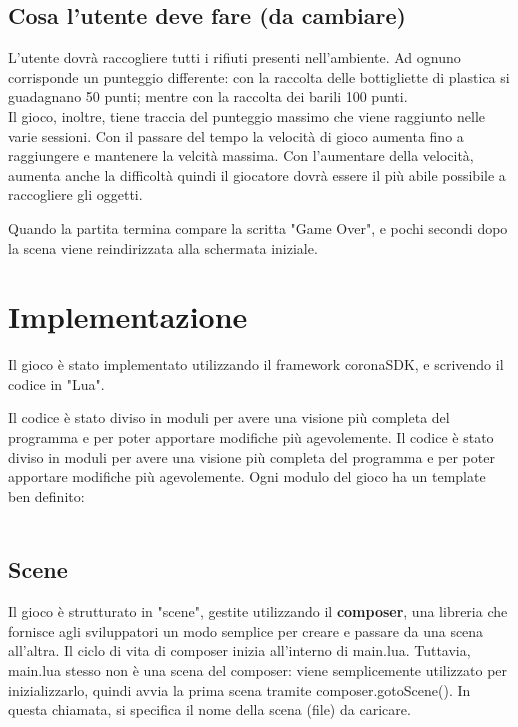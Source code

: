 \documentclass[12pt]{article}
\begin{document}
\subsection{Cosa l'utente deve fare (da cambiare)}
 
L'utente dovrà raccogliere tutti i rifiuti presenti nell'ambiente. Ad ognuno corrisponde un punteggio differente: con la raccolta delle bottigliette di plastica si guadagnano 50 punti; mentre con la raccolta dei barili 100 punti. 
\\Il gioco, inoltre, tiene traccia del punteggio massimo che viene raggiunto nelle varie sessioni.
Con il passare del tempo la velocità di gioco aumenta fino a raggiungere e mantenere la velcità massima. Con l'aumentare della velocità, aumenta anche la difficoltà quindi il giocatore dovrà essere il più abile possibile a raccogliere gli oggetti. 


Quando la partita termina compare la scritta "Game Over", e pochi secondi dopo la scena viene reindirizzata alla schermata iniziale. 

\section{Implementazione}
Il gioco è stato implementato utilizzando il framework coronaSDK, e scrivendo il codice in "Lua". 


Il codice è stato diviso in moduli per avere una visione più completa del programma e per poter apportare modifiche più agevolemente. 
Il codice è stato diviso in moduli per avere una visione più completa del programma e per poter apportare modifiche più agevolemente. 
Ogni modulo del gioco ha un template ben definito:
\\\\


\subsection{Scene}
Il gioco è strutturato in "scene", gestite utilizzando il \textbf{composer}, una libreria che fornisce agli sviluppatori  un modo semplice per creare e passare da una scena all'altra. Il ciclo di vita di composer inizia all'interno di main.lua. Tuttavia, main.lua stesso non è una scena del composer: viene semplicemente utilizzato per inizializzarlo, quindi avvia la prima scena tramite composer.gotoScene(). In questa chiamata, si specifica il nome della scena (file) da caricare. 
\end{document}
